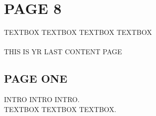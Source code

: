 \documentclass[a4paper,landscape]{article}
\begin{document}
\newpage

\begin{minipage}[t]{0.45\linewidth}
\vspace*{0.2\textheight}
\section*{PAGE 8}
    \begin{center}
        \parbox{4.5in}{
            TEXTBOX TEXTBOX TEXTBOX TEXTBOX\\ \\
            THIS IS YR LAST CONTENT PAGE \\}
    \end{center}
\end{minipage}%
\hspace{0.75in}
\begin{minipage}[t]{0.45\linewidth}
\vspace*{0.2\textheight}
\begin{center}
\section*{PAGE ONE}
    \parbox{4.5in}{
    INTRO INTRO INTRO.\\
    
    TEXTBOX TEXTBOX TEXTBOX.\\
    
    }
    \end{center}
\end{minipage}
\end{document}
